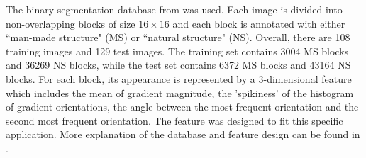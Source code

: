 The binary segmentation database from \cite{img_seg_database} was used.  Each image is divided into non-overlapping blocks of 
size $16\times16$ and each block is annotated with either ``man-made structure" (MS) or ``natural structure" (NS). 
Overall, there are 108 training images and 129 test images. The training set contains 3004 MS blocks and 36269 NS blocks, while the test set 
contains 6372 MS blocks and 43164 NS blocks.
For each block, its appearance is 
represented by a 3-dimensional feature which includes the mean of gradient magnitude, the 'spikiness' of the histogram of gradient orientations, 
the angle between the most frequent orientation and the second most frequent orientation. The feature was designed to fit this specific application.        
More explanation of the database and feature design can be found in \cite{img_seg_database}. 


